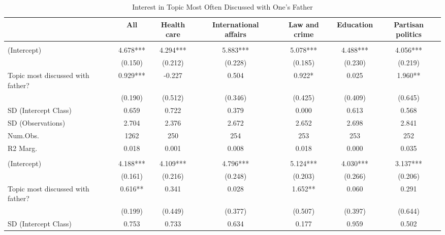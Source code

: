 \documentclass[
  letterpaper,
  DIV=11,
  numbers=noendperiod]{scrreprt}
\begin{document}
\begin{table}
\centering\centering
\caption{Interest in Topic Most Often Discussed with One's Father \label{tab:lmeFather}}
\centering
\fontsize{6}{8}\selectfont
\begin{tabular}[t]{lcccccc}
\toprule
  & All & Health care & International affairs & Law and crime & Education & Partisan politics\\
\midrule
\addlinespace[0.5em]
\multicolumn{7}{l}{\textit{Boys}}\\
\midrule \hspace{1em}(Intercept) & 4.678*** & 4.294*** & 5.883*** & 5.078*** & 4.488*** & 4.056***\\
\hspace{1em} & (0.150) & (0.212) & (0.228) & (0.185) & (0.230) & (0.219)\\
\hspace{1em}Topic most discussed with father? & 0.929*** & -0.227 & 0.504 & 0.922* & 0.025 & 1.960**\\
\hspace{1em} & (0.190) & (0.512) & (0.346) & (0.425) & (0.409) & (0.645)\\
\hspace{1em}SD (Intercept Class) & 0.659 & 0.722 & 0.379 & 0.000 & 0.613 & 0.568\\
\hspace{1em}SD (Observations) & 2.704 & 2.376 & 2.672 & 2.652 & 2.698 & 2.841\\
\hspace{1em}Num.Obs. & 1262 & 250 & 254 & 253 & 253 & 252\\
\hspace{1em}R2 Marg. & 0.018 & 0.001 & 0.008 & 0.018 & 0.000 & 0.035\\
\addlinespace[0.5em]
\multicolumn{7}{l}{\textit{Girls}}\\
\midrule \hspace{1em}(Intercept) & 4.188*** & 4.109*** & 4.796*** & 5.124*** & 4.030*** & 3.137***\\
\hspace{1em} & (0.161) & (0.216) & (0.248) & (0.203) & (0.266) & (0.206)\\
\hspace{1em}Topic most discussed with father? & 0.616** & 0.341 & 0.028 & 1.652** & 0.060 & 0.291\\
\hspace{1em} & (0.199) & (0.449) & (0.377) & (0.507) & (0.397) & (0.644)\\
\hspace{1em}SD (Intercept Class) & 0.753 & 0.733 & 0.634 & 0.177 & 0.959 & 0.502\\

\end{tabular}
\end{table}
\end{document}
